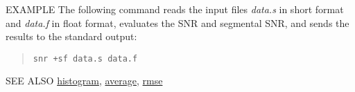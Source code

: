 \begin{qsection}{EXAMPLE}
The following command reads the input files {\em data.s} in short format
and {\em data.f} in float format, evaluates the SNR and
segmental SNR, and sends the results to the standard output:
\begin{quote}
 \verb!snr +sf data.s data.f!
\end{quote} 
\end{qsection}

\begin{qsection}{SEE ALSO}
\hyperlink{histogram}{histogram},
\hyperlink{average}{average},
\hyperlink{rmse}{rmse}
\end{qsection}
